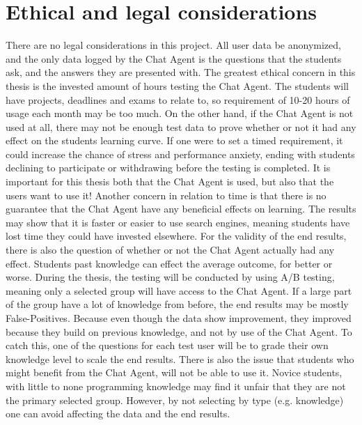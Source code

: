 \chapter{Ethical and legal considerations}
\label{chapter8:ethical_legeal_considerations}
There are no legal considerations in this project. All user data be anonymized, and the only data logged by the Chat Agent is the questions that the students ask, and the answers 
they are presented with. The greatest ethical concern in this thesis is the invested amount of hours testing the Chat Agent. The students will have projects, deadlines and exams 
to relate to, so requirement of 10-20 hours of usage each month may be too much. On the other hand, if the Chat Agent is not used at all, there may not be enough test data to prove 
whether or not it had any effect on the students learning curve. If one were to set a timed requirement, it could increase the chance of stress and performance anxiety, ending with 
students declining to participate or withdrawing before the testing is completed. It is important for this thesis both that the Chat Agent is used, but also that the users want to 
use it! Another concern in relation to time is that there is no guarantee that the Chat Agent have any beneficial effects on learning. The results may show that it is faster or 
easier to use search engines, meaning students have lost time they could have invested elsewhere.
\vspace{0.5em}\newline
For the validity of the end results, there is also the question of whether or not the Chat Agent actually had any effect. Students past knowledge can effect the average outcome, 
for better or worse. During the thesis, the testing will be conducted by using A/B testing, meaning only a selected group will have access to the Chat Agent. If a large part of the 
group have a lot of knowledge from before, the end results may be mostly False-Positives. Because even though the data show improvement, they improved because they build on previous 
knowledge, and not by use of the Chat Agent. To catch this, one of the questions for each test user will be to grade their own knowledge level to scale the end results. There is 
also the issue that students who might benefit from the Chat Agent, will not be able to use it. Novice students, with little to none programming knowledge may find it unfair that 
they are not the primary selected group. However, by not selecting by type (e.g. knowledge) one can avoid affecting the data and the end results.
